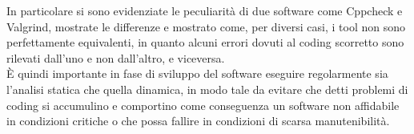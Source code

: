 \documentclass{article}
\begin{document}
In particolare si sono evidenziate le peculiarità di due software come Cppcheck
e Valgrind, mostrate le differenze e mostrato come, per diversi casi, i tool non
sono perfettamente equivalenti, in quanto alcuni errori dovuti al coding
scorretto sono rilevati dall'uno e non dall'altro, e viceversa. \\

È quindi importante in fase di sviluppo del software eseguire regolarmente sia
l'analisi statica che quella dinamica, in modo tale da evitare che detti
problemi di coding si accumulino e comportino come conseguenza un software non
affidabile in condizioni critiche o che possa fallire in condizioni di scarsa manutenibilità.
\end{document}
